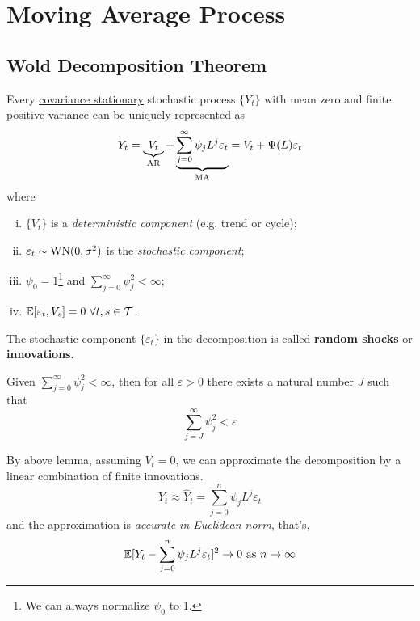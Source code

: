 \documentclass[11pt]{article}
\begin{document}
	\section{Moving Average Process}
		\subsection{Wold Decomposition Theorem}
			\begin{theorem}
				Every \ul{covariance stationary} stochastic process $\{Y_t\}$ with mean zero and finite positive variance can be \ul{uniquely} represented as
				\begin{equation}
					Y_t = \underbrace{V_t}_{\text{{AR}}} + \underbrace{\sum_{j=0}^\infty \psi_j L^j \varepsilon_t}_{\text{{MA}}} = V_t + \Psi(L)\varepsilon_t
				\end{equation}
				where 
				\begin{enumerate}[(i)]
					\item $\{V_t\}$ is a \emph{deterministic component} (e.g. trend or cycle);
					\item $\varepsilon_t \sim \text{{WN}}(0, \sigma^2)$ is the \emph{stochastic component};
					\item $\psi_0 = 1$\footnote{We can always normalize $\psi_0$ to 1.} and $\sum_{j=0}^\infty \psi_j^2 < \infty$;
					\item $\expect{\varepsilon_t, V_s} = 0\ \forall t, s \in \mc{T}$.
				\end{enumerate}
			\end{theorem}
			\begin{definition}
				The stochastic component $\{\varepsilon_t\}$ in the decomposition is called \textbf{random shocks} or \textbf{innovations}.
			\end{definition}
			
			\begin{lemma}
				Given $\sum_{j=0}^\infty \psi_j^2 < \infty$, then for all $\varepsilon > 0$ there exists a natural number $J$ such that
				\begin{equation}
					\sum_{j=J}^\infty \psi_j^2 < \varepsilon
				\end{equation}
			\end{lemma}
			
			\begin{corollary}
				By above lemma, assuming $V_t = 0$, we can approximate the decomposition by a linear combination of finite innovations.
				\begin{equation}
					Y_t \approx \hat{Y}_t = \sum_{j=0}^n \psi_j L^j \varepsilon_t
				\end{equation}
				and the approximation is \emph{accurate in Euclidean norm}, that's,
				\begin{equation}
					\mathbb{E}[{Y_t -\sum_{j=0}^n \psi_j L^j \varepsilon_t}]^2 \rightarrow 0 \text{{ as }} n \to \infty
				\end{equation}
			\end{corollary}
			
\end{document}
